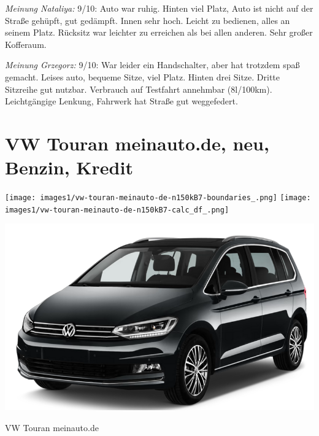 \documentclass[landscape, DIV=99, 14pt]{scrartcl}
\begin{document}
\begin{small}
\emph{Meinung Nataliya:} 9/10: Auto war ruhig. Hinten viel Platz, Auto ist nicht auf der Straße gehüpft,
                    gut gedämpft. Innen sehr hoch. Leicht zu bedienen, alles an seinem Platz. Rücksitz
                    war leichter zu erreichen als bei allen anderen. Sehr großer Kofferaum.
        
\emph{Meinung Grzegorz:} 9/10: War leider ein Handschalter, aber hat trotzdem spaß gemacht. 
                   Leises auto, bequeme Sitze, viel Platz. Hinten drei Sitze. Dritte Sitzreihe gut nutzbar.
                   Verbrauch auf Testfahrt annehmbar (8l/100km). Leichtgängige Lenkung, Fahrwerk hat Straße 
                   gut weggefedert.
\end{small}

\pagebreak


\twocolumn

\section*{VW Touran meinauto.de, neu, Benzin, Kredit}
\begin{center}
\texttt{[image: images1/vw-touran-meinauto-de-n150kB7-boundaries\_.png]}
\null
\vspace{0.5cm}
\texttt{[image: images1/vw-touran-meinauto-de-n150kB7-calc\_df\_.png]}
\end{center}

\pagebreak
\begin{center}
\includegraphics[width=0.9\columnwidth]{cars/vw-touran.png}

VW Touran meinauto.de
\end{center}
\end{document}
